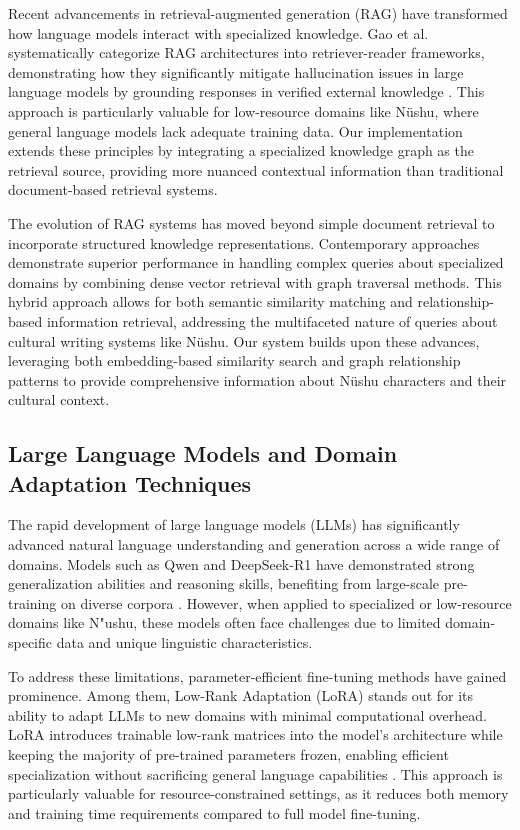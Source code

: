 \documentclass{article}
\begin{document}
    Recent advancements in retrieval-augmented generation (RAG) have transformed how language models interact with specialized knowledge. Gao et al. systematically categorize RAG architectures into retriever-reader frameworks, demonstrating how they significantly mitigate hallucination issues in large language models by grounding responses in verified external knowledge \cite{gaoRetrievalAugmentedGenerationLarge2024}. This approach is particularly valuable for low-resource domains like N\"{u}shu, where general language models lack adequate training data. Our implementation extends these principles by integrating a specialized knowledge graph as the retrieval source, providing more nuanced contextual information than traditional document-based retrieval systems.
    
    The evolution of RAG systems has moved beyond simple document retrieval to incorporate structured knowledge representations. Contemporary approaches demonstrate superior performance in handling complex queries about specialized domains by combining dense vector retrieval with graph traversal methods. This hybrid approach allows for both semantic similarity matching and relationship-based information retrieval, addressing the multifaceted nature of queries about cultural writing systems like N\"{u}shu. Our system builds upon these advances, leveraging both embedding-based similarity search and graph relationship patterns to provide comprehensive information about N\"{u}shu characters and their cultural context.

\subsection{Large Language Models and Domain Adaptation Techniques}
\label{ssec:llm_lora}
    The rapid development of large language models (LLMs) has significantly advanced natural language understanding and generation across a wide range of domains. Models such as Qwen and DeepSeek-R1 have demonstrated strong generalization abilities and reasoning skills, benefiting from large-scale pre-training on diverse corpora \cite{baiQwenTechnicalReport2023, deepseek-aiDeepSeekR1IncentivizingReasoning2025}. However, when applied to specialized or low-resource domains like N"{u}shu, these models often face challenges due to limited domain-specific data and unique linguistic characteristics.

    To address these limitations, parameter-efficient fine-tuning methods have gained prominence. Among them, Low-Rank Adaptation (LoRA) stands out for its ability to adapt LLMs to new domains with minimal computational overhead. LoRA introduces trainable low-rank matrices into the model's architecture while keeping the majority of pre-trained parameters frozen, enabling efficient specialization without sacrificing general language capabilities \cite{huLoRALowRankAdaptation2021}. This approach is particularly valuable for resource-constrained settings, as it reduces both memory and training time requirements compared to full model fine-tuning.
\end{document}
